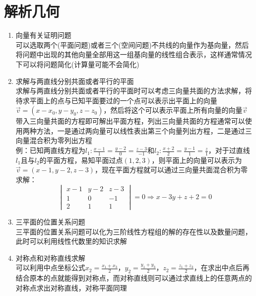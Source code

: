 \documentclass[12pt,a4paper,UTF8]{book}
\begin{document}
\section{解析几何}
\begin{enumerate}
\item 向量有关证明问题\\
可以选取两个(平面问题)或者三个(空间问题)不共线的向量作为基向量，然后将问题中出现的其他向量全部用这一组基向量的线性组合表示，这样通常情况下可以将问题简化(计算量可能不会简化)
\item 求解与两直线分别共面或者平行的平面\\
求解与两直线分别共面或者平行的平面时可以考虑三向量共面的方法求解，将待求平面上的点与已知平面要过的一个点可以表示出平面上的向量$\vec{v}=\left(x-x_0,y-y_0,z-z_0\right)$，然后将这个可以表示平面上所有向量的向量$\vec{v}$带入三向量共面的方程即可解出平面方程，列出三向量共面的方程通常可以使用两种方法，一是通过两向量可以线性表出第三个向量列出方程，二是通过三向量混合积为零列出方程\\
例：已知两直线方程为$l_1:\frac{x-1}{1}=\frac{y-2}{0}=\frac{z-3}{-1}$和$l_2:\frac{x+2}{2}=\frac{y-1}{1}=\frac{z}{1}$，对于过直线$l_1$且与$l_2$的平面方程，易知平面过点$\left(1,2,3\right)$，则平面上的向量可以表示为$\vec{v}=\left(x-1,y-2,z-3\right)$，现在平面方程就可以通过三向量共面混合积为零求解：
\[\begin{vmatrix}x-1&y-2&z-3\\1&0&-1\\2&1&1\end{vmatrix}=0\Rightarrow x-3y+z+2=0\]
\item 三平面的位置关系问题\\
三平面的位置关系问题可以化为三阶线性方程组的解的存在性以及数量问题，此时可以利用线性代数里的知识求解
\item 对称点和对称直线求解\\
可以利用中点坐标公式$x_2=\frac{x_1+x_3}{2}$，$y_2=\frac{y_1+y_3}{2}$，$z_2=\frac{z_1+z_3}{2}$，在求出中点后再结合原本的点就能得到对称点，而对称直线则可以通过求直线上的任意两点的对称点求出对称直线，对称平面同理
\end{enumerate}
\end{document}
